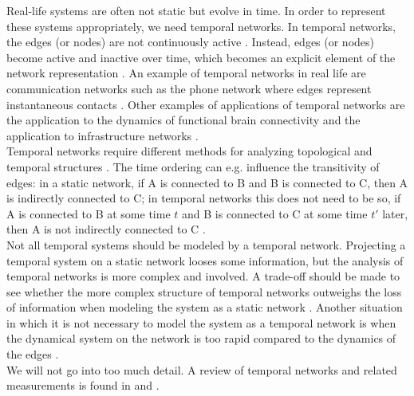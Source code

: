 \documentclass[11 pt , letterpaper , twoside , openright]{book}
\begin{document}
Real-life systems are often not static but evolve in time. In order to represent these systems appropriately, we need temporal networks. In temporal networks, the edges (or nodes) are not continuously active \cite{Holme2012}. Instead, edges (or nodes) become active and inactive over time, which becomes an explicit element of the network representation \cite{Holme2012}. An example of temporal networks in real life are communication networks such as the phone network where edges represent instantaneous contacts \cite{Holme2012}. Other examples of applications of temporal networks are the application to the dynamics of functional brain connectivity \cite{Thompson2017} and the application to infrastructure networks \cite{Salama2020}.\\
\newline
Temporal networks require different methods for analyzing topological and temporal structures \cite{Holme2012}\cite{Holme2021}. The time ordering can e.g. influence the transitivity of edges: in a static network, if A is connected to B and B is connected to C, then A is indirectly connected to C; in temporal networks this does not need to be so, if A is connected to B at some time $t$ and B is connected to C at some time $t'$ later, then A is not indirectly connected to C \cite{Holme2012}.\\
\newline
Not all temporal systems should be modeled by a temporal network. Projecting a temporal system on a static network looses some information, but the analysis of temporal networks is more complex and involved. A trade-off should be made to see whether the more complex structure of temporal networks outweighs the loss of information when modeling the system as a static network \cite{Holme2012}. Another situation in which it is not necessary to model the system as a temporal network is when the dynamical system on the network is too rapid compared to the dynamics of the edges \cite{Holme2012}.\\
\newline
We will not go into too much detail. A review of temporal networks and related measurements is found in \cite{Holme2012} and \cite{Holme2021}.
\end{document}
